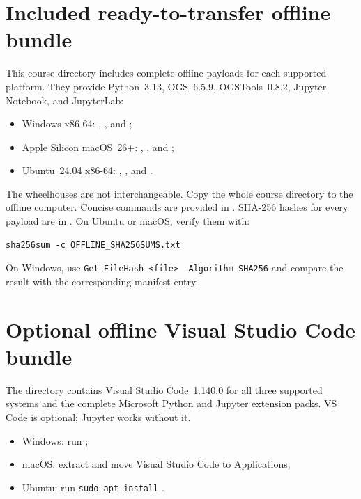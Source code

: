 \documentclass[11pt,a4paper]{tubaf-report}
\begin{document}
\section{Included ready-to-transfer offline bundle}

This course directory includes complete offline payloads for each supported
platform. They provide Python~3.13, OGS~6.5.9, OGSTools~0.8.2, Jupyter
Notebook, and JupyterLab:

\begin{itemize}
  \item Windows x86-64: ,
        , and ;
  \item Apple Silicon macOS~26+: ,
        , and ;
  \item Ubuntu~24.04 x86-64: ,
        , and .
\end{itemize}

The wheelhouses are not interchangeable. Copy the whole course directory to
the offline computer. Concise commands are provided in
. SHA-256 hashes for every payload are in
. On Ubuntu or macOS, verify them with:

\begin{lstlisting}[style=terminal]
sha256sum -c OFFLINE_SHA256SUMS.txt
\end{lstlisting}

On Windows, use \texttt{Get-FileHash <file> -Algorithm SHA256} and compare
the result with the corresponding manifest entry.

\section{Optional offline Visual Studio Code bundle}

The  directory contains Visual Studio Code~1.140.0
for all three supported systems and the complete Microsoft Python and Jupyter
extension packs. VS Code is optional; Jupyter works without it.

\begin{itemize}
  \item Windows: run ;
  \item macOS: extract 
        and move Visual Studio Code to Applications;
  \item Ubuntu: run \texttt{sudo apt install}
        .
\end{itemize}
\end{document}
